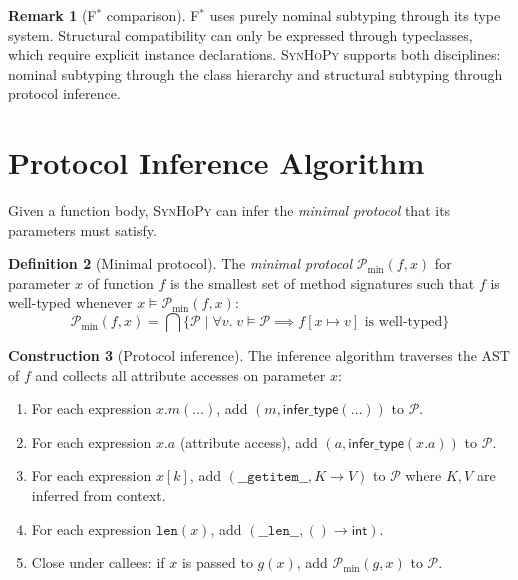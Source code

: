 \documentclass[11pt,a4paper]{report}
\theoremstyle{definition}
\newtheorem{definition}{Definition}[chapter]
\newtheorem{remark}[definition]{Remark}
\newtheorem{construction}[definition]{Construction}
\theoremstyle{plain}
\newcommand{\fstar}{F$^{*}$}
\newcommand{\synhopy}{\textsc{SynHoPy}}
\begin{document}
\begin{remark}[\fstar{} comparison]
\fstar{} uses purely nominal subtyping through its type system. Structural
compatibility can only be expressed through typeclasses, which require explicit
instance declarations. \synhopy{} supports both disciplines: nominal subtyping
through the class hierarchy and structural subtyping through protocol inference.
\end{remark}


\section{Protocol Inference Algorithm}
\label{sec:protocol-inference}

Given a function body, \synhopy{} can infer the \emph{minimal protocol} that
its parameters must satisfy.

\begin{definition}[Minimal protocol]
The \emph{minimal protocol} $\mathcal{P}_{\min}(f, x)$ for parameter $x$ of function
$f$ is the smallest set of method signatures such that $f$ is well-typed whenever
$x \models \mathcal{P}_{\min}(f, x)$:
\[
  \mathcal{P}_{\min}(f, x) = \bigcap \{ \mathcal{P} \mid
    \forall v.\; v \models \mathcal{P} \implies f[x \mapsto v] \text{ is well-typed} \}
\]
\end{definition}

\begin{construction}[Protocol inference]
\label{con:protocol-infer}
The inference algorithm traverses the AST of $f$ and collects all attribute
accesses on parameter $x$:
\begin{enumerate}
  \item For each expression $x.m(\ldots)$, add $(m, \mathsf{infer\_type}(\ldots))$
    to $\mathcal{P}$.
  \item For each expression $x.a$ (attribute access), add $(a, \mathsf{infer\_type}(x.a))$
    to $\mathcal{P}$.
  \item For each expression $x[k]$, add $(\mathtt{\_\_getitem\_\_}, K \to V)$
    to $\mathcal{P}$ where $K, V$ are inferred from context.
  \item For each expression $\mathtt{len}(x)$, add $(\mathtt{\_\_len\_\_}, () \to \mathsf{int})$.
  \item Close under callees: if $x$ is passed to $g(x)$, add
    $\mathcal{P}_{\min}(g, x)$ to $\mathcal{P}$.
\end{enumerate}
\end{construction}
\end{document}
